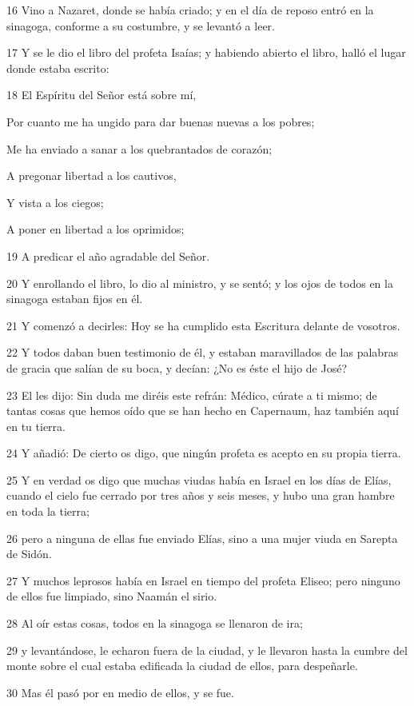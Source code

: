 \par 16 Vino a Nazaret, donde se había criado; y en el día de reposo entró en la sinagoga, conforme a su costumbre, y se levantó a leer.
\par 17 Y se le dio el libro del profeta Isaías; y habiendo abierto el libro, halló el lugar donde estaba escrito:
\par 18 El Espíritu del Señor está sobre mí,
\par Por cuanto me ha ungido para dar buenas nuevas a los pobres;
\par Me ha enviado a sanar a los quebrantados de corazón;
\par A pregonar libertad a los cautivos,
\par Y vista a los ciegos;
\par A poner en libertad a los oprimidos;
\par 19 A predicar el año agradable del Señor.
\par 20 Y enrollando el libro, lo dio al ministro, y se sentó; y los ojos de todos en la sinagoga estaban fijos en él.
\par 21 Y comenzó a decirles: Hoy se ha cumplido esta Escritura delante de vosotros.
\par 22 Y todos daban buen testimonio de él, y estaban maravillados de las palabras de gracia que salían de su boca, y decían: ¿No es éste el hijo de José?
\par 23 El les dijo: Sin duda me diréis este refrán: Médico, cúrate a ti mismo; de tantas cosas que hemos oído que se han hecho en Capernaum, haz también aquí en tu tierra.
\par 24 Y añadió: De cierto os digo, que ningún profeta es acepto en su propia tierra.
\par 25 Y en verdad os digo que muchas viudas había en Israel en los días de Elías, cuando el cielo fue cerrado por tres años y seis meses, y hubo una gran hambre en toda la tierra;
\par 26 pero a ninguna de ellas fue enviado Elías, sino a una mujer viuda en Sarepta de Sidón.
\par 27 Y muchos leprosos había en Israel en tiempo del profeta Eliseo; pero ninguno de ellos fue limpiado, sino Naamán el sirio.
\par 28 Al oír estas cosas, todos en la sinagoga se llenaron de ira;
\par 29 y levantándose, le echaron fuera de la ciudad, y le llevaron hasta la cumbre del monte sobre el cual estaba edificada la ciudad de ellos, para despeñarle.
\par 30 Mas él pasó por en medio de ellos, y se fue.

